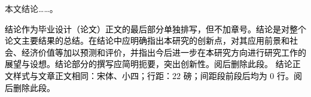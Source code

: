 \renewcommand{\thechapter}{结论}


本文结论……。\cite{李成智2004飞行之梦,chen2014,liu2023}

\textcolor{black}{结论作为毕业设计（论文）正文的最后部分单独排写，但不加章号。结论是对整个论文主要结果的总结。在结论中应明确指出本研究的创新点，对其应用前景和社会、经济价值等加以预测和评价，并指出今后进一步在本研究方向进行研究工作的展望与设想。结论部分的撰写应简明扼要，突出创新性。阅后删除此段。}
\textcolor{black}{结论正文样式与文章正文相同：宋体、小四；行距：22 磅；间距段前段后均为 0 行。阅后删除此段。}